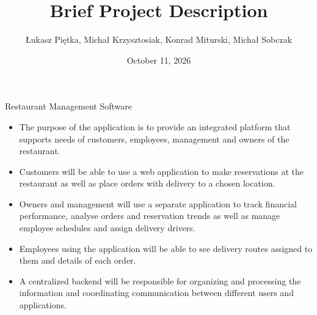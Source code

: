 \documentclass{beamer}
\date{October 11, 2026}
\author{Łukasz Piętka, Michał Krzysztosiak, Konrad Miturski, Michał Sobczak}
\title{Brief Project Description}
\begin{document}
\maketitle

\begin{frame}{Restaurant Management Software}
\begin{itemize}

\item The purpose of the application is to provide an integrated platform that supports needs of customers, employees, management and owners of the restaurant.
\item Customers will be able to use a web application to make reservations at the restaurant as well as place orders with delivery to a chosen location.
\item Owners and management will use a separate application to track financial performance, analyse orders and reservation trends as well as manage employee schedules and assign delivery drivers. 
\item Employees using the application will be able to see delivery routes assigned to them and details of each order.
\item A centralized backend will be responsible for organizing and processing the information and coordinating communication between different users and applications.

\end{itemize}
\end{frame}
\end{document}
